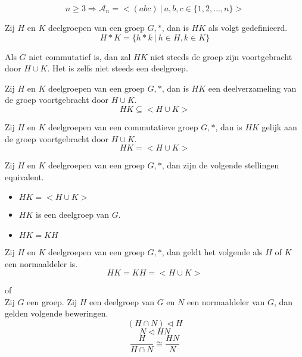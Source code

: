 \documentclass[main.tex]{subfiles}
\begin{document}
\begin{pr}
\[ n \ge 3 \Rightarrow \mathcal{A}_n = <(abc)\ |\ a,b,c \in \{1,2,\dotsc,n\}> \]
\end{pr}

\begin{de}
Zij $H$ en $K$ deelgroepen van een groep $G,*$, dan is $HK$ als volgt gedefinieerd.
\[ H*K = \{ h*k\ |\ h\in H, k\in K \} \]
\end{de}

\begin{opm}
Als $G$ niet commutatief is, dan zal $HK$ niet steeds de groep zijn voortgebracht door $H\cup K$.
Het is zelfs niet steeds een deelgroep.
\end{opm}

\begin{st}
Zij $H$ en $K$ deelgroepen van een groep $G,*$, dan is $HK$ een deelverzameling van de groep voortgebracht door $H\cup K$.
\[ HK \subseteq <H\cup K> \]
\end{st}

\begin{st}
Zij $H$ en $K$ deelgroepen van een commutatieve groep $G,*$, dan is $HK$ gelijk aan de groep voortgebracht door $H\cup K$.
\[ HK = <H\cup K> \]
\end{st}

\begin{pr}
Zij $H$ en $K$ deelgroepen van een groep $G,*$, dan zijn de volgende stellingen equivalent.
\begin{itemize}
\item $HK = <H\cup K>$
\item $HK$ is een deelgroep van $G$.
\item $HK = KH$
\end{itemize}
\end{pr}

\begin{gev}
Zij $H$ en $K$ deelgroepen van een groep $G,*$, dan geldt het volgende als $H$ of $K$ een normaaldeler is.
\[ HK = KH = <H\cup K> \]
\end{gev}

\begin{st}
 of \\
Zij $G$ een groep. Zij $H$ een deelgroep van $G$ en $N$ een normaaldeler van $G$, dan gelden volgende beweringen.
\[ (H \cap N) \triangleleft H \]
\[ N \triangleleft HN \]
\[ \frac{H}{H\cap N} \cong \frac{HN}{N} \]
\end{st}
\end{document}
